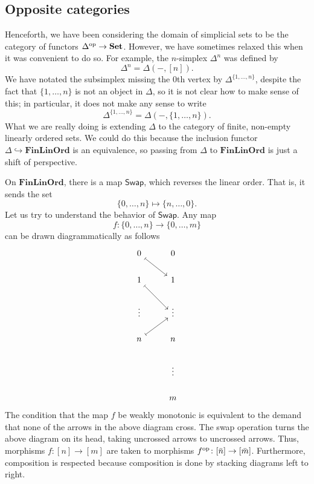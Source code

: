 \documentclass[main.tex]{subfiles}
\begin{document}
\subsection{Opposite categories}
\label{ssc:opposite_categories}

Henceforth, we have been considering the domain of simplicial sets to be the category of functors $\Delta^{\mathrm{op}} \to \mathbf{Set}$. However, we have sometimes relaxed this when it was convenient to do so. For example, the $n$-simplex $\Delta^{n}$ was defined by
\begin{equation*}
  \Delta^{n} = \Delta(-, [n]).
\end{equation*}
We have notated the subsimplex missing the 0th vertex by $\Delta^{\{1, \ldots, n\}}$, despite the fact that $\{1, \ldots, n\}$ is not an object in $\Delta$, so it is not clear how to make sense of this; in particular, it does not make any sense to write
\begin{equation*}
  \Delta^{\{1, \ldots, n\}} = \Delta(-, \{1, \ldots, n\}).
\end{equation*}
What we are really doing is extending $\Delta$ to the category of finite, non-empty linearly ordered sets. We could do this because the inclusion functor $\Delta \hookrightarrow \mathbf{FinLinOrd}$ is an equivalence, so passing from $\Delta$ to $\mathbf{FinLinOrd}$ is just a shift of perspective.

On $\mathbf{FinLinOrd}$, there is a map $\mathsf{Swap}$, which reverses the linear order. That is, it sends the set
\begin{equation*}
  \{0, \ldots, n\} \mapsto \{n, \ldots, 0\}.
\end{equation*}
Let us try to understand the behavior of $\mathsf{Swap}$. Any map
\begin{equation*}
  f\colon \{0, \ldots, n\} \to \{0, \ldots, m\}
\end{equation*}
can be drawn diagrammatically as follows
\begin{equation*}
  \begin{tikzcd}
    0
    \arrow[dr, mapsto]
    & 0
    \\
    1
    \arrow[dr, mapsto]
    & 1
    \\
    \vdots
    & \vdots
    \\
    n
    \arrow[ur, mapsto]
    & n
    \\
    & \vdots
    \\
    & m
  \end{tikzcd}
\end{equation*}
The condition that the map $f$ be weakly monotonic is equivalent to the demand that none of the arrows in the above diagram cross. The swap operation turns the above diagram on its head, taking uncrossed arrows to uncrossed arrows. Thus, morphisms $f\colon [n] \to [m]$ are taken to morphisms $f^{\mathrm{op}}\colon [\bar{n}] \to [\bar{m}]$. Furthermore, composition is respected because composition is done by stacking diagrams left to right.
\end{document}
